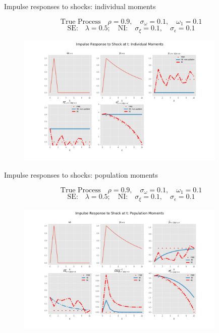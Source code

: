 \documentclass{beamer}
\begin{document}
\begin{frame}{Impulse responses to shocks: individual moments}


$$\textrm{True Process} \quad   \rho=0.9, \quad \sigma_\omega= 0.1, \quad \omega_1 = 0.1$$
$$ \textrm{SE:} \quad  \lambda = 0.5; \quad \textrm{NI:} \quad \sigma_\xi = 0.1, \quad \sigma_\epsilon = 0.1$$

\begin{figure}
	\includegraphics[height=6.3cm,width=10cm]{figuresDraft/ir_indseni} 
\end{figure}

\end{frame}

\begin{frame}{Impulse responses to shocks: population moments}


$$\textrm{True Process} \quad   \rho=0.9, \quad \sigma_\omega= 0.1, \quad \omega_1 = 0.1$$
$$ \textrm{SE:} \quad  \lambda = 0.5; \quad \textrm{NI:} \quad \sigma_\xi = 0.1, \quad \sigma_\epsilon = 0.1$$

\begin{figure}
	\includegraphics[height=6.3cm,width=10cm]{figuresDraft/ir_popseni} 
\end{figure}

\end{frame}
\end{document}

